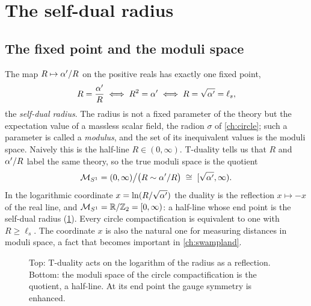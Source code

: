 \section{The self-dual radius}\label{sec:tduality:selfdual}

\subsection{The fixed point and the moduli space}

The map $R\mapsto\alpha'/R$ on the positive reals has exactly one fixed point,
\begin{equation}\label{eq:tduality:sd}
  R=\frac{\alpha'}{R}\iff R^2=\alpha'\iff R=\sqrt{\alpha'}=\ell_s ,
\end{equation}
the \emph{self-dual radius}. The radius is not a fixed parameter of the
theory but the expectation value of a massless scalar field, the radion $\sigma$ of
\cref{ch:circle}; such a parameter is called a \emph{modulus},
and the set of its inequivalent values is the moduli space. Naively this is the half-line
$R\in(0,\infty)$. T-duality tells us that $R$ and $\alpha'/R$ label the same theory, so the true
moduli space is the quotient
\begin{equation}\label{eq:tduality:moduli}
  \mathcal M_{S^1}=(0,\infty)\big/\big(R\sim\alpha'/R\big)\;\cong\;[\sqrt{\alpha'},\infty).
\end{equation}
In the logarithmic coordinate $x=\ln(R/\sqrt{\alpha'})$ the duality is the reflection
$x\mapsto-x$ of the real line, and $\mathcal M_{S^1}=\mathbb{R}/\mathbb{Z}_2=[0,\infty)$: a half-line whose
end point is the self-dual radius (\cref{fig:tduality:moduli}). Every circle compactification is
equivalent to one with $R\ge\ell_s$. The coordinate $x$ is also the natural one for measuring
distances in moduli space, a fact that becomes important in \cref{ch:swampland}.

\begin{figure}[ht]
\centering
{}
\caption{Top: T-duality acts on the logarithm of the radius as a reflection. Bottom: the
moduli space of the circle compactification is the quotient, a half-line. At its end point
the gauge symmetry is enhanced.}
\label{fig:tduality:moduli}
\end{figure}

